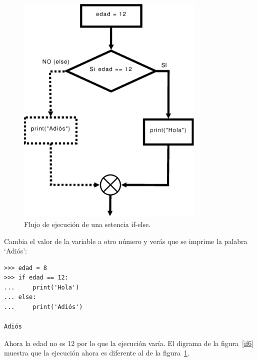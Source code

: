\begin{figure}
\begin{center}
\includegraphics[width=90mm]{if5.eps}
\end{center}
\caption{Flujo de ejecución de una setencia if-else.}\label{if5}
\end{figure}

Cambia el valor de la variable  a otro número y verás que se imprime la palabra `Adiós':

\begin{listing}
\begin{verbatim}
>>> edad = 8
>>> if edad == 12:
...     print('Hola')
... else:
...     print('Adiós')

Adiós
\end{verbatim}
\end{listing}

Ahora la edad no es 12 por lo que la ejecución varía. El digrama de la figura~\ref{if6} muestra que la ejecución ahora es diferente al de la figura~\ref{if5}.

